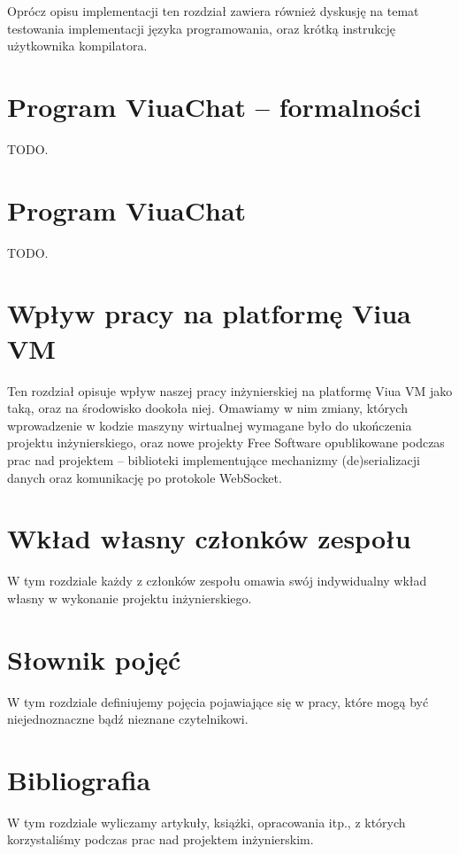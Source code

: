 \documentclass[11pt,oneside,a4paper,titlepage,onecolumn]{book}
\begin{document}
Oprócz opisu implementacji ten rozdział zawiera również dyskusję na temat testowania implementacji języka
programowania, oraz krótką instrukcję użytkownika kompilatora.


\section{Program ViuaChat -- formalności}

TODO.

\section{Program ViuaChat}

TODO.


\section{Wpływ pracy na platformę Viua VM}

Ten rozdział opisuje wpływ naszej pracy inżynierskiej na platformę Viua VM jako taką, oraz na środowisko
dookoła niej. Omawiamy w nim zmiany, których wprowadzenie w kodzie maszyny wirtualnej wymagane było do
ukończenia projektu inżynierskiego, oraz nowe projekty Free Software opublikowane podczas prac nad projektem
-- biblioteki implementujące mechanizmy (de)serializacji danych oraz komunikację po protokole WebSocket.


\section{Wkład własny członków zespołu}

W tym rozdziale każdy z członków zespołu omawia swój indywidualny wkład własny w wykonanie projektu
inżynierskiego.

\section{Słownik pojęć}

W tym rozdziale definiujemy pojęcia pojawiające się w pracy, które mogą być niejednoznaczne bądź nieznane
czytelnikowi.

\section{Bibliografia}

W tym rozdziale wyliczamy artykuły, książki, opracowania itp., z których korzystaliśmy podczas prac nad
projektem inżynierskim.
\end{document}
